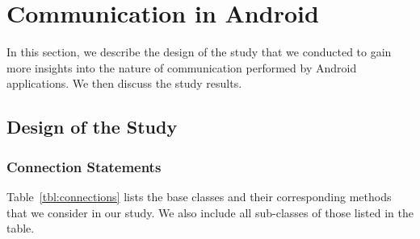 


\section{Communication in Android}
\label{sec:study} 

In this section, we describe the design of the study that we conducted to gain more insights into the nature of communication performed by Android applications. We then discuss the study results. 

\subsection{Design of the Study}

\subsubsection{Connection Statements}
Table~\ref{tbl:connections} lists the base classes and their corresponding methods that we consider in our study. 
We also include all sub-classes of those listed in the table.

